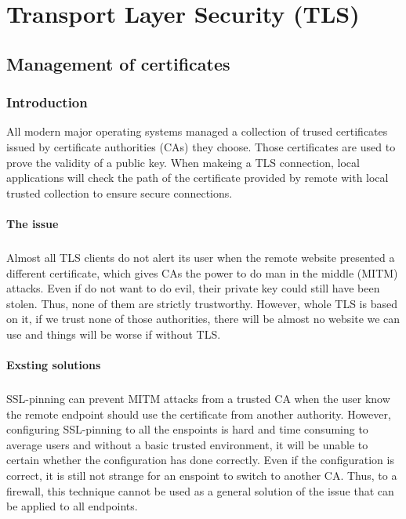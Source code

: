 \documentclass[mscthesis]{usiinfthesis}
\begin{document}
\chapter{Transport Layer Security (TLS)}

\section{Management of certificates}

\subsection{Introduction}
All modern major operating systems managed a collection of trused certificates issued by certificate authorities (CAs) they choose. Those certificates are used to prove the validity of a public key. When makeing a TLS connection, local applications will check the path of the certificate provided by remote with local trusted collection to ensure secure connections.
\subsubsection{The issue}
\paragraph{}
Almost all TLS clients do not alert its user when the remote website presented a different certificate, which gives CAs the power to do man in the middle (MITM) attacks. Even if  do not want to do evil, their private key could still have been stolen. Thus, none of them are strictly trustworthy. However, whole TLS is based on it, if we trust none of those authorities, there will be almost no website we can use and things will be worse if without TLS.
\subsubsection{Exsting solutions}
\paragraph{}
SSL-pinning can prevent MITM attacks from a trusted CA when the user know the remote endpoint should use the certificate from another authority. However, configuring SSL-pinning to all the enspoints is hard and time consuming to average users and without a basic trusted environment, it will be unable to certain whether the configuration has done correctly. Even if the configuration is correct, it is still not strange for an enspoint to switch to another CA. Thus, to a firewall, this technique cannot be used as a general solution of the issue that can be applied to all endpoints.
\end{document}

